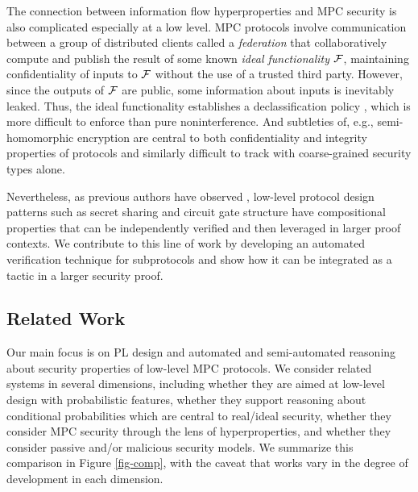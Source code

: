 The connection between information flow hyperproperties and MPC
security is also complicated especially at a low level.  MPC protocols
involve communication between a group of distributed clients called a
\emph{federation} that collaboratively compute and publish the result
of some known \emph{ideal functionality} $\mathcal{F}$, maintaining
confidentiality of inputs to $\mathcal{F}$ without the use of a trusted
third party. However, since the outputs of $\mathcal{F}$ are public, some
information about inputs is inevitably leaked. Thus, the ideal
functionality establishes a declassification policy
\cite{sabelfeld2009declassification}, which is more difficult to
enforce than pure noninterference.  And subtleties of, e.g.,
semi-homomorphic encryption are central to both confidentiality and
integrity properties of protocols and similarly difficult to track
with coarse-grained security types alone.

Nevertheless, as previous authors have observed
\cite{5a51987acaa84c43bb4bf5bcc7d01683}, low-level protocol design
patterns such as secret sharing and circuit gate structure have
compositional properties that can be independently verified and then
leveraged in larger proof contexts. We contribute to this line of work
by developing an automated verification technique for subprotocols and
show how it can be integrated as a tactic in a larger security proof.

\compfig

\subsection{Related Work}
\label{section-related-work}

Our main focus is on PL design and automated and semi-automated
reasoning about security properties of low-level MPC protocols.  We
consider related systems in several dimensions, including
whether they are aimed at low-level design with probabilistic features,
whether they support reasoning about conditional probabilities which
are central to real/ideal security, whether they consider MPC
security through the lens of hyperproperties, and whether they consider
passive and/or malicious security models. We summarize this comparison
in Figure \ref{fig-comp}, with the caveat that works vary in the degree
of development in each dimension.

